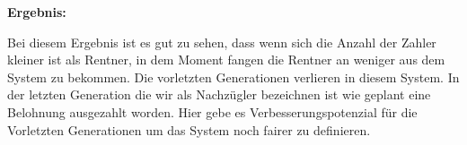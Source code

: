 \textbf{Ergebnis:}

\begin{table}[hbt!]
\centering
{}
\end{table}

Bei diesem Ergebnis ist es gut zu sehen, dass wenn sich die Anzahl der Zahler kleiner ist als Rentner, in dem Moment fangen die Rentner an weniger aus dem System zu bekommen. Die vorletzten Generationen verlieren in diesem System. In der letzten Generation die wir als Nachzügler bezeichnen ist wie geplant eine Belohnung ausgezahlt worden. Hier gebe es Verbesserungspotenzial für die Vorletzten Generationen um das System noch fairer zu definieren.

